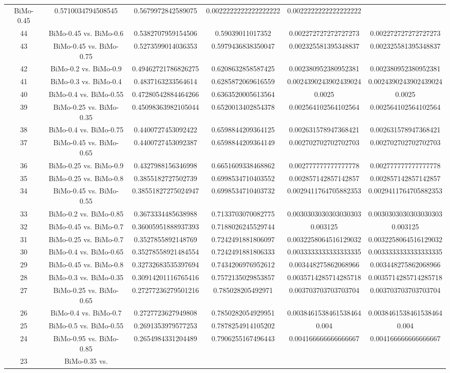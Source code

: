 \documentclass[a4paper,10pt]{article}
\begin{document}
\begin{landscape}
\begin{table}[!htp]
\begin{tabular}{cccccc}
BiMo-0.45&0.5710034794508545&0.5679972842589075&0.0022222222222222222&0.0022222222222222222\\44&BiMo-0.45 vs. BiMo-0.6&0.5382707959154506&0.59039011017352&0.002272727272727273&0.002272727272727273\\43&BiMo-0.45 vs. BiMo-0.75&0.5273599014036353&0.5979436838350047&0.002325581395348837&0.002325581395348837\\42&BiMo-0.2 vs. BiMo-0.9&0.49462721786826275&0.6208632858587425&0.002380952380952381&0.002380952380952381\\41&BiMo-0.3 vs. BiMo-0.4&0.4837163233564614&0.6285872069616559&0.0024390243902439024&0.0024390243902439024\\40&BiMo-0.4 vs. BiMo-0.55&0.47280542884464266&0.6363520005613564&0.0025&0.0025\\39&BiMo-0.25 vs. BiMo-0.35&0.45098363982105044&0.6520013402854378&0.002564102564102564&0.002564102564102564\\38&BiMo-0.4 vs. BiMo-0.75&0.4400727453092422&0.6598844209364125&0.002631578947368421&0.002631578947368421\\37&BiMo-0.45 vs. BiMo-0.65&0.4400727453092387&0.6598844209364149&0.002702702702702703&0.002702702702702703\\36&BiMo-0.25 vs. BiMo-0.9&0.4327988156346998&0.6651609338468862&0.002777777777777778&0.002777777777777778\\35&BiMo-0.25 vs. BiMo-0.8&0.3855182727502739&0.6998534710403552&0.002857142857142857&0.002857142857142857\\34&BiMo-0.45 vs. BiMo-0.55&0.38551827275024947&0.6998534710403732&0.0029411764705882353&0.0029411764705882353\\33&BiMo-0.2 vs. BiMo-0.85&0.3673334485638988&0.7133703070082775&0.0030303030303030303&0.0030303030303030303\\32&BiMo-0.45 vs. BiMo-0.7&0.36005951888937393&0.7188026245529744&0.003125&0.003125\\31&BiMo-0.25 vs. BiMo-0.7&0.3527855892148769&0.7242491881806097&0.0032258064516129032&0.0032258064516129032\\30&BiMo-0.4 vs. BiMo-0.65&0.35278558921484554&0.7242491881806333&0.0033333333333333335&0.0033333333333333335\\29&BiMo-0.45 vs. BiMo-0.8&0.32732683535397694&0.7434206976952612&0.003448275862068966&0.003448275862068966\\28&BiMo-0.3 vs. BiMo-0.35&0.30914201116765416&0.7572135029853857&0.0035714285714285718&0.0035714285714285718\\27&BiMo-0.25 vs. BiMo-0.65&0.27277236279501216&0.785028205492971&0.003703703703703704&0.003703703703703704\\26&BiMo-0.4 vs. BiMo-0.7&0.2727723627949808&0.7850282054929951&0.0038461538461538464&0.0038461538461538464\\25&BiMo-0.5 vs. BiMo-0.55&0.2691353979577253&0.7878254914105202&0.004&0.004\\24&BiMo-0.95 vs. BiMo-0.85&0.2654984331204489&0.7906255167496443&0.004166666666666667&0.004166666666666667\\23&BiMo-0.35 vs. 
\end{tabular}
\end{table}
\end{landscape}
\end{document}
